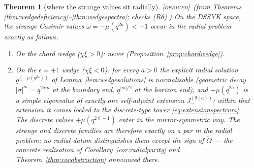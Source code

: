\documentclass[11pt,a4paper]{article}
\newcommand{\DERIVED}{{\color{teal}\textsc{[derived]}}}
\theoremstyle{definition}
\theoremstyle{plain}
\newtheorem{theorem}[definition]{Theorem}
\newcommand{\tCas}{\tilde\Omega}                %
\begin{document}
\begin{theorem}[where the strange values sit radially]\label{thm:radialstrange}
\DERIVED\ (from Theorems \ref{thm:wedgedeficiency}--\ref{thm:wedgespectra}; checks (R6).)
On the DSSYK space, the strange Casimir values $\omega=-\mu(q^{2a})<-1$ occur in the radial
problem exactly as follows.
\begin{enumerate}[label=(\roman*)]
\item On the chord wedge ($\chi\xi>0$): never (Proposition~\ref{prop:chordwedge}).
\item On the $\epsilon=+1$ wedge ($\chi\xi<0$): for \emph{every} $a>0$ the explicit
radial solution $g^{(-\mu(q^{2a}))}$ of Lemma~\ref{lem:wedgesolutions} is normalisable
(geometric decay $|\sigma|^{m}=q^{2am}$ at the boundary end, $q^{|m|/2}$ at the horizon
end), and $-\mu(q^{2a})$ is a simple eigenvalue of exactly one self-adjoint extension
$J^{(\theta(a))}_{-}$; within that extension it comes locked to the discrete-type tower
\eqref{eq:extensionspectrum}. The discrete values $+\mu(q^{2\ell-1})$ enter in the
mirror-symmetric way. The strange and discrete families are therefore \emph{exactly on a
par} in the radial problem; no radial datum distinguishes them except the sign of
$\tCas$ --- the concrete realisation of Corollary~\ref{cor:radialparity} and
Theorem~\ref{thm:covobstruction} announced there.
\end{enumerate}
\end{theorem}
\end{document}
